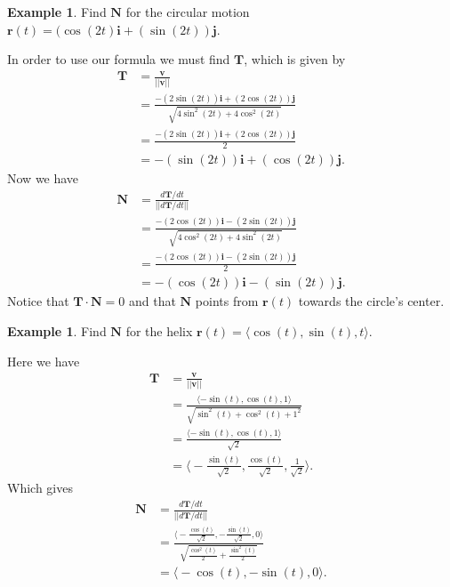 \documentclass[12pt, letter]{article}
\theoremstyle{plain}
\numberwithin{theorem}{section}
\theoremstyle{definition}
\newtheorem{example}[theorem]{Example}
\begin{document}
\begin{example}
Find $\bm{N}$ for the circular motion $\bm{r}(t) = (\cos(2t)\bm{i}+(\sin(2t))\bm{j}$.\\

\smallskip

In order to use our formula we must find $\bm{T}$, which is given by
\begin{align*}
\bm{T} &= \frac{\bm{v}}{||\bm{v}||}\\
&= \frac{-(2\sin(2t))\bm{i}+(2\cos(2t))\bm{j}}{\sqrt{4\sin^2(2t)+4\cos^2(2t)}}\\
&= \frac{-(2\sin(2t))\bm{i}+(2\cos(2t))\bm{j}}{2}\\
&= -(\sin(2t))\bm{i} + (\cos(2t))\bm{j}.
\end{align*}
Now we have
\begin{align*}
\bm{N} &= \frac{d\bm{T}/dt}{||d\bm{T}/dt||}\\
&= \frac{-(2\cos(2t))\bm{i} -(2\sin(2t))\bm{j}}{\sqrt{4\cos^2(2t)+4\sin^2(2t)}}\\
&= \frac{-(2\cos(2t))\bm{i} -(2\sin(2t))\bm{j}}{2}\\
&= -(\cos(2t))\bm{i} -(\sin(2t))\bm{j}.
\end{align*}
Notice that $\bm{T}\cdot\bm{N} =0$ and that $\bm{N}$ points from $\bm{r}(t)$ towards the circle's center.
\end{example}

\bigskip

\hrulefill

\bigskip

\begin{example}
Find $\bm{N}$ for the helix $\bm{r}(t) = \langle \cos(t), \sin(t), t \rangle$. \\

\smallskip

Here we have
\begin{align*}
\bm{T} &= \frac{\bm{v}}{||\bm{v}||}\\
&= \frac{\langle -\sin(t), \cos(t), 1 \rangle}{\sqrt{\sin^2(t)+\cos^2(t)+1^2}}\\
&= \frac{\langle -\sin(t), \cos(t), 1 \rangle}{\sqrt{2}}\\
&= \bigg\langle -\frac{\sin(t)}{\sqrt{2}}, \frac{\cos(t)}{\sqrt{2}}, \frac{1}{\sqrt{2}} \bigg\rangle.
\end{align*}
Which gives
\begin{align*}
\bm{N} &= \frac{d\bm{T}/dt}{||d\bm{T}/dt||}\\
&= \frac{\bigg\langle -\frac{\cos(t)}{\sqrt{2}}, -\frac{\sin(t)}{\sqrt{2}}, 0 \bigg\rangle}{\sqrt{\frac{\cos^2(t)}{2}+\frac{\sin^2(t)}{2}}}\\
&= \bigg\langle -\cos(t), -\sin(t), 0 \bigg\rangle.
\end{align*}
\end{example}
\end{document}

